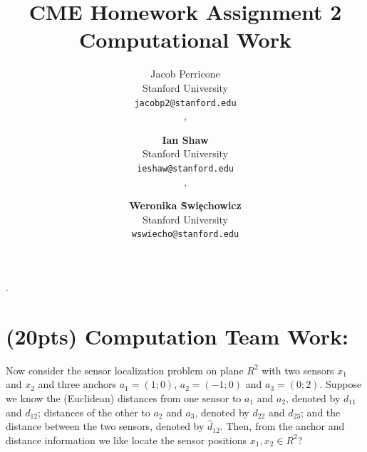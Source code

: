 \documentclass{article} %
\title{CME Homework Assignment 2 Computational Work}
\author{
Jacob Perricone \\
Stanford University\\
\texttt{jacobp2@stanford.edu} \\, \and
\textbf{Ian Shaw}\\
Stanford University\\
\texttt{ieshaw@stanford.edu} \\, \and
\textbf{Weronika \`Swi\c echowicz} \\ 
Stanford University\\
\texttt{wswiecho@stanford.edu}
}
\begin{document}
    \newcommand{\argmin}{\operatornamewithlimits{argmin}}.
    \maketitle
    
    
    

\section*{(20pts) Computation Team Work: }
 Now consider the sensor localization problem on plane $R^2$ with two sensors $x_1$ and $x_2$ and three anchors $a_1=(1;0)$, $a_2=(-1;0)$ and $a_3=(0;2)$. Suppose we know the (Euclidean) distances from one sensor to $a_1$ and $a_2$, denoted by $d_{11}$ and $d_{12}$; distances of the other to $a_2$ and $a_3$, denoted by $d_{22}$ and $d_{23}$; and the distance between the two sensors, denoted by $\hat{d}_{12}$. Then, from the anchor and distance information we like locate the sensor positions $x_1, x_2\in R^2$?
\end{document}
